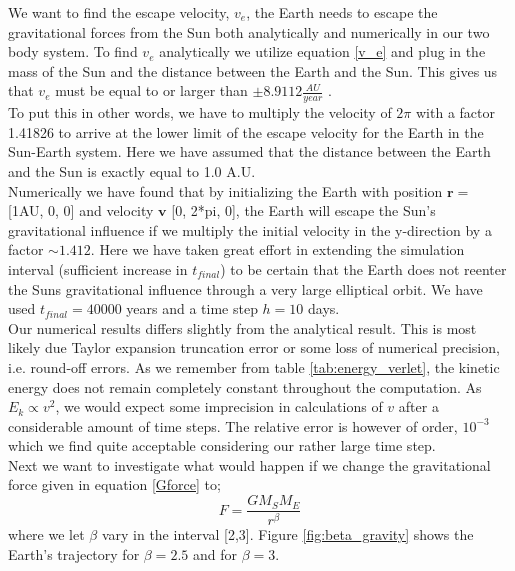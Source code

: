 \documentclass[12pt]{article}
\numberwithin{figure}{section}
\numberwithin{table}{section}
\begin{document}
\noindent We want to find the escape velocity, $v_e$, the Earth needs to escape the gravitational forces from the Sun both analytically and numerically in our two body system. To find $v_e$ analytically we utilize equation \eqref{v_e} and plug in the mass of the Sun and the distance between the Earth and the Sun. This gives us that $v_e$ must be equal to or larger than $\pm 8.9112 \frac{AU}{year}$ . \\

\noindent To put this in other words, we have to multiply the velocity of $2\pi$ with a factor 1.41826 to arrive at the lower limit of the escape velocity for the Earth in the Sun-Earth system. Here we have assumed that the distance between the Earth and the Sun is exactly equal to 1.0 A.U. \\



\noindent Numerically we have found that by initializing the Earth with position $\mathbf{r}=$ [1AU, 0, 0] and velocity $\mathbf{v}$ [0, 2*pi, 0], the Earth will escape the Sun's gravitational influence if we multiply the initial velocity in the y-direction by a factor $\sim 1.412$. Here we have taken great effort in extending the simulation interval (sufficient increase in $t_{final}$) to be certain that the Earth does not reenter the Suns gravitational influence through a very large elliptical orbit. We have used $t_{final} = 40 000$ years and a time step $h=10$ days.\\ 

\noindent Our numerical results differs slightly from the analytical result. This is most likely due Taylor expansion truncation error or some loss of numerical precision, i.e. round-off errors. As we remember from table \ref{tab:energy_verlet}, the kinetic energy does not remain completely constant throughout the computation. As $E_k\propto v^2$, we would expect some imprecision in calculations of $v$ after a considerable amount of time steps. The relative error is however of order, $10^{-3}$ which we find quite acceptable considering our rather large time step.\\

\noindent Next we want to investigate what would happen if we change the gravitational force given in equation \eqref{Gforce} to;
\begin{equation}
		\label{altGforce}
        F = \frac{ G M_S M_E}{r^\beta}
\end{equation}
\noindent where we let $\beta$ vary in the interval [2,3]. Figure \ref{fig:beta_gravity} shows the Earth's trajectory for $\beta=2.5$ and for $\beta = 3$. \\
\end{document}
